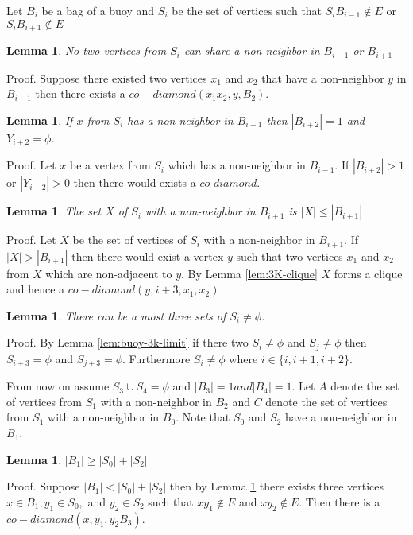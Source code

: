 \documentclass[12pt]{article}
\newtheorem{Lemma}[Theorem]{Lemma}
\begin{document}
Let $B_i$ be a bag of a buoy and $S_i$ be the set of vertices such that $S_iB_{i-1} \not \in E$ or $S_iB_{i+1} \not \in E$


\begin{Lemma}\label{lem:si-no-share-vertex}
No two vertices from $S_i$ can share a non-neighbor in $B_{i-1}$ or $B_{i+1}$
\end{Lemma}
\noindent {\it} Proof. Suppose there existed two vertices $x_1$ and $x_2$ that have a non-neighbor $y$ in $B_{i-1}$ then there exists a $co-diamond (x_1x_2, y, B_2)$.

\begin{Lemma}\label{lem:buoy-3K-limit}
If $x$ from $S_i$ has a non-neighbor in $B_{i-1}$ then $|B_{i+2}| = 1$ and $Y_{i+2} = \phi$.  
\end{Lemma}
\noindent {\it} Proof. Let $x$ be a vertex from $S_i$ which has a non-neighbor in $B_{i-1}$. If $|B_{i+2}| > 1$ or  $|Y_{i+2}| > 0$  then there would exists a $co$-$diamond$.

\begin{Lemma}\label{lem:si-limit}
The set $X$ of $S_i$ with a non-neighbor in $B_{i+1}$ is $|X| \leq |B_{i+1}|$ 
\end{Lemma}
\noindent {\it} Proof. Let $X$ be the set of vertices of $S_i$ with a non-neighbor in $B_{i+1}$. If $|X| > |B_{i+1}|$ then there would exist a vertex $y$ such that two vertices $x_1$ and $x_2$ from $X$ which are non-adjacent to $y$. By Lemma \ref{lem:3K-clique} $X$ forms a clique and hence a $co-diamond (y, i+3, x_1, x_2)$

\begin{Lemma}\label{lem:max-3-si}
There can be a most three sets of $S_i \neq \phi$. 
\end{Lemma}
\noindent {\it} Proof. By Lemma \ref{lem:buoy-3k-limit} if there two $S_i \neq \phi$ and $S_j \neq \phi$ then  $S_{i+3} = \phi$ and $S_{j+3} = \phi$. Furthermore $S_i \neq \phi$ where $i \in \{i, i+1, i+2\}$. 

From now on assume $S_3 \cup S_4 = \phi$ and $|B_3| = 1 and |B_4| = 1$. Let $A$ denote the set of vertices from $S_1$ with a non-neighbor in $B_2$ and $C$ denote the set of vertices from $S_1$ with a non-neighbor in $B_0$. Note that $S_0$ and $S_2$ have a non-neighbor in $B_1$.

\begin{Lemma}\label{lem:max-s0-s2}
$|B_1| \geq |S_0| + |S_2|$
\end{Lemma}
\noindent {\it} Proof. Suppose $|B_1| < |S_0| + |S_2|$ then by Lemma \ref{lem:si-no-share-vertex} there exists three vertices $x \in B_1, y_1 \in S_0,$ and $y_2 \in S_2$ such that $xy_1 \not \in E$ and $xy_2 \not \in E$. Then there is a $co-diamond (x, y_1, y_2B_3)$.
\end{document}
